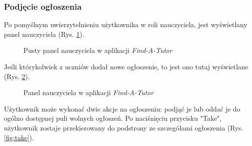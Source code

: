 \documentclass[12pt]{article}
\numberwithin{figure}{section}
\begin{document}
\begin{sloppypar}
\subsubsection{Podjęcie ogłoszenia}
Po pomyślnym uwierzytelnieniu użytkownika w roli nauczyciela, jest wyświetlany panel nauczyciela (Rys. \ref{fig:tutor-empty}).
\begin{figure}[!htbp] 
    \centering
    \caption{Pusty panel nauczyciela w aplikacji \textit{Find-A-Tutor}}
    \label{fig:tutor-empty}
\end{figure}

Jeśli którykolwiek z uczniów dodał nowe ogłoszenie, to jest ono tutaj wyświetlane (Rys. \ref{fig:tutor}).
\begin{figure}[!htbp] 
    \centering
    \caption{Panel nauczyciela w aplikacji \textit{Find-A-Tutor}}
    \label{fig:tutor}
\end{figure}
Użytkownik może wykonać dwie akcje na ogłoszeniu: podjąć je lub oddać je do ogólno dostępnej puli wolnych ogłoszeń. \indent Po naciśnięciu przycisku "Take", użytkownik zostaje przekierowany do podstrony ze szczegółami ogłoszenia (Rys. \ref{fig:take}).


\end{sloppypar}
\end{document}
